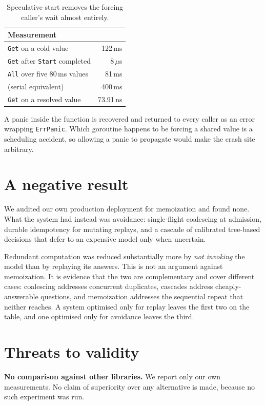 \documentclass[10pt,twocolumn]{article}
\begin{document}
\begin{table}[h]\centering\small
\begin{tabular}{lr}
\toprule
Measurement & \\
\midrule
\texttt{Get} on a cold value & 122\,ms \\
\texttt{Get} after \texttt{Start} completed & $8\,\mu$s \\
\texttt{All} over five 80\,ms values & 81\,ms \\
\quad (serial equivalent) & 400\,ms \\
\texttt{Get} on a resolved value & 73.91\,ns \\
\bottomrule
\end{tabular}
\caption{Speculative start removes the forcing caller's wait almost entirely.}
\end{table}

A panic inside the function is recovered and returned to every caller as an error
wrapping \texttt{ErrPanic}. Which goroutine happens to be forcing a shared value
is a scheduling accident, so allowing a panic to propagate would make the crash
site arbitrary.

\section{A negative result}

We audited our own production deployment for memoization and found none. What the
system had instead was avoidance: single-flight coalescing at admission, durable
idempotency for mutating replays, and a cascade of calibrated tree-based decisions
that defer to an expensive model only when uncertain.

Redundant computation was reduced substantially more by \emph{not invoking} the
model than by replaying its answers. This is not an argument against memoization.
It is evidence that the two are complementary and cover different cases:
coalescing addresses concurrent duplicates, cascades address cheaply-answerable
questions, and memoization addresses the sequential repeat that neither reaches.
A system optimised only for replay leaves the first two on the table, and one
optimised only for avoidance leaves the third.

\section{Threats to validity}

\textbf{No comparison against other libraries.} We report only our own
measurements. No claim of superiority over any alternative is made, because no
such experiment was run.
\end{document}

